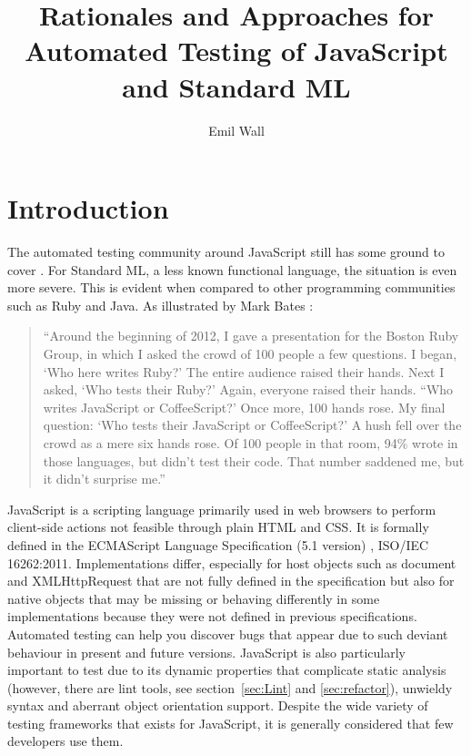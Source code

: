 \documentclass[11pt]{article}
\title{Rationales and Approaches for Automated Testing of JavaScript and Standard ML}
\author{Emil Wall}
\begin{document}
%
\tableofcontents %

\section{Introduction}

The automated testing community around JavaScript still has some ground to cover \cite[p.~xix]{Tddjs}. For Standard ML, a less known functional language, the situation is even more severe. This is evident when compared to other programming communities such as Ruby and Java. As illustrated by Mark Bates \cite{TestingStatistics}:

\begin{quote}
``Around the beginning of 2012, I gave a presentation for the Boston Ruby Group, in which I asked the crowd of 100 people a few questions. I began, `Who here writes Ruby?' The entire audience raised their hands. Next I asked, `Who tests their Ruby?' Again, everyone raised their hands. ``Who writes JavaScript or CoffeeScript?' Once more, 100 hands rose. My final question: `Who tests their JavaScript or CoffeeScript?' A hush fell over the crowd as a mere six hands rose. Of 100 people in that room, 94\% wrote in those languages, but didn't test their code. That number saddened me, but it didn't surprise me.''
\end{quote}

JavaScript is a scripting language primarily used in web browsers to perform client-side actions not feasible through plain HTML and CSS. It is formally defined in the ECMAScript Language Specification (5.1 version) \cite{ECMAScriptSpecification}, ISO/IEC 16262:2011. Implementations differ, especially for host objects such as document and XMLHttpRequest that are not fully defined in the specification but also for native objects that may be missing or behaving differently in some implementations because they were not defined in previous specifications. Automated testing can help you discover bugs that appear due to such deviant behaviour in present and future versions. JavaScript is also particularly important to test due to its dynamic properties \cite{AutomatedTesting} that complicate static analysis (however, there are lint tools, see section~\ref{sec:Lint} and \ref{sec:refactor}), unwieldy syntax and aberrant object orientation support. Despite the wide variety of testing frameworks that exists for JavaScript, it is generally considered that few developers use them.
\end{document}
